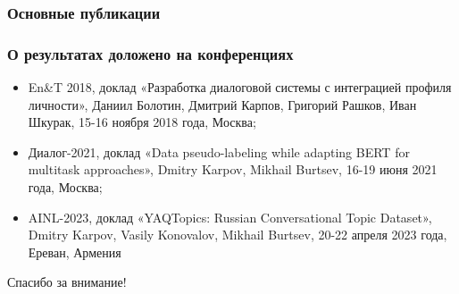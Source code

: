 \iffalse
\begin{frame}
    \frametitle{Акт о внедрении}
    \begin{figure}[h]
        \centering
        \fbox{
            \begin{minipage}[t]{0.4\linewidth}
                \texttt{[image: implementation]}
            \end{minipage}
        }
    \end{figure}
\end{frame}
\note{
    Получен акт о внедрении.
}
\fi

\begin{frame}[t,allowframebreaks] %
    \frametitle{Основные публикации}
    \nocite{pseudolabel}
    \nocite{rumtl}%
    \nocite{rutopics}
    \nocite{dream1}
    \nocite{dream1_trudy}
    \nocite{dream2}
    \nocite{dp_2023}
\end{frame}

\begin{frame}
    \frametitle{О результатах доложено на конференциях}
    \begin{itemize}
   \item En\&T 2018, доклад «Разработка диалоговой системы с интеграцией профиля личности», Даниил Болотин, Дмитрий Карпов, Григорий Рашков, Иван Шкурак, 15-16 ноября 2018 года, Москва;
   \item Диалог-2021, доклад «Data pseudo-labeling while adapting BERT for multitask approaches», Dmitry Karpov, Mikhail Burtsev, 16-19 июня 2021 года, Москва;
   \item AINL-2023, доклад «YAQTopics: Russian Conversational Topic Dataset», Dmitry Karpov, Vasily Konovalov, Mikhail Burtsev, 20-22 апреля 2023 года, Ереван, Армения
    \end{itemize}
\end{frame}
\note{
}

\begin{frame} %
    \begin{center}
        \Huge
        Спасибо за внимание!
    \end{center}
\end{frame}

